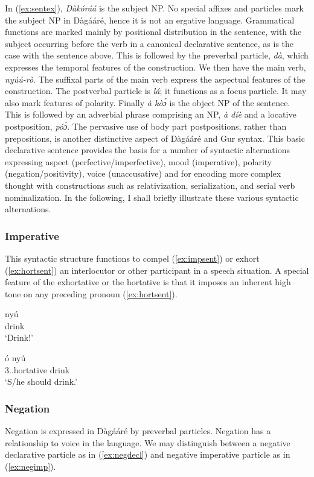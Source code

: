 \begin{refsection}
In (\ref{ex:sentex}), \textit{Dàkóráá} is the subject NP. No special affixes and particles mark the subject NP in
Dàgááré, hence it is not an ergative language. Grammatical functions are marked mainly by
positional distribution in the sentence, with the subject occurring before the verb in a
canonical declarative sentence, as is the case with the sentence above. This is followed by the
preverbal particle, \textit{dà}, which expresses the temporal features of the construction. We then
have the main verb, \textit{nyúú-rò}. The suffixal parts of the main verb express the aspectual
features of the construction. The postverbal particle is \textit{lá}; it functions as a focus particle. It
may also mark features of polarity. Finally \textit{à kòɔ́} is the object NP of the sentence. This is
followed by an adverbial phrase comprising an NP, \textit{à díè} and a locative postposition, \textit{póɔ́}.
The pervasive use of body part postpositions, rather than prepositions, is another distinctive
aspect of Dàgááré and Gur syntax.
This basic declarative sentence provides the basis for a number of syntactic
alternations expressing aspect (perfective/imperfective), mood (imperative), polarity
(negation/positivity), voice (unaccusative) and for encoding more complex thought with constructions such as relativization, serialization, and serial verb nominalization.
In the following, I shall briefly illustrate these various syntactic alternations.

\subsubsection{Imperative}
This syntactic structure functions to compel (\ref{ex:impsent}) or exhort (\ref{ex:hortsent}) an interlocutor or other
participant in a speech situation. A special feature of the exhortative or the hortative is that it
imposes an inherent high tone on any preceding pronoun (\ref{ex:hortsent}).

\ea \label{ex:impsent} \gll nyú\\
drink\\
\glt ‘Drink!’\z

\ea \label{ex:hortsent} \gll ó nyú\\
3.{\SG}.hortative drink\\
\glt ‘S/he should drink.’\z 

\subsubsection{ Negation}
Negation is expressed in Dàgááré by preverbal particles. Negation has a relationship
to voice in the language. We may distinguish between a negative declarative particle as in (\ref{ex:negdecl})
and negative imperative particle as in (\ref{ex:negimp}).


\end{refsection}

